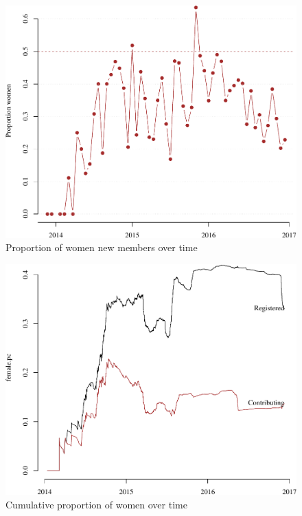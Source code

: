 \begin{frame}

\begin{figure}
\centering
\includegraphics{report_slides_files/figure-beamer/overtime-1.pdf}
\caption{Proportion of women new members over time}
\end{figure}

\end{frame}

\begin{frame}

\begin{figure}
\centering
\includegraphics{report_slides_files/figure-beamer/cumsum-1.pdf}
\caption{Cumulative proportion of women over time}
\end{figure}

\end{frame}

